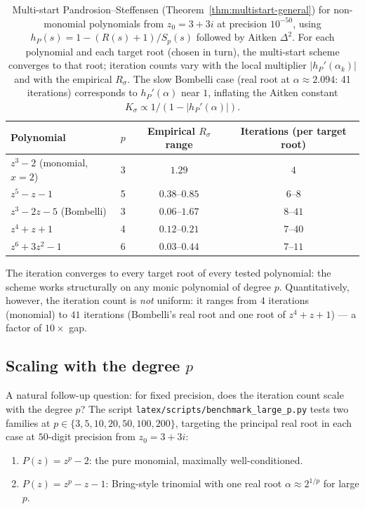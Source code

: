 \documentclass[11pt,a4paper]{article}
\theoremstyle{definition}
\begin{document}
\begin{table}[H]
\centering
\small
\renewcommand{\arraystretch}{1.2}
\begin{tabular}{lccc}
\toprule
Polynomial & $p$ & Empirical $R_\sigma$ range & Iterations (per target root) \\
\midrule
$z^3 - 2$ (monomial, $x=2$)   & 3 & $1.29$          & $4$ \\
$z^5 - z - 1$                 & 5 & $0.38$--$0.85$  & $6$--$8$ \\
$z^3 - 2z - 5$ (Bombelli)     & 3 & $0.06$--$1.67$  & $8$--$41$ \\
$z^4 + z + 1$                 & 4 & $0.12$--$0.21$  & $7$--$40$ \\
$z^6 + 3z^2 - 1$              & 6 & $0.03$--$0.44$  & $7$--$11$ \\
\bottomrule
\end{tabular}
\caption{Multi-start Pandrosion--Steffensen (Theorem~\ref{thm:multistart-general}) for non-monomial polynomials from $z_0 = 3 + 3i$ at precision $10^{-50}$, using $h_P(s) = 1 - (R(s) + 1)/S_p(s)$ followed by Aitken $\Delta^2$. For each polynomial and each target root (chosen in turn), the multi-start scheme converges to that root; iteration counts vary with the local multiplier $|h_P'(\alpha_k)|$ and with the empirical $R_\sigma$. The slow Bombelli case (real root at $\alpha \approx 2.094$: 41 iterations) corresponds to $h_P'(\alpha)$ near $1$, inflating the Aitken constant $K_\sigma \propto 1/(1 - |h_P'(\alpha)|)$.}
\label{tab:multistart-general}
\end{table}

The iteration converges to every target root of every tested polynomial: the scheme works structurally on any monic polynomial of degree $p$. Quantitatively, however, the iteration count is \emph{not} uniform: it ranges from $4$ iterations (monomial) to $41$ iterations (Bombelli's real root and one root of $z^4 + z + 1$) --- a factor of $10\times$ gap.

\subsection{Scaling with the degree $p$}

A natural follow-up question: for fixed precision, does the iteration count scale with the degree $p$? The script \texttt{latex/scripts/benchmark\_large\_p.py} tests two families at $p \in \{3, 5, 10, 20, 50, 100, 200\}$, targeting the principal real root in each case at $50$-digit precision from $z_0 = 3 + 3i$:
\begin{enumerate}
  \item[(A)] $P(z) = z^p - 2$: the pure monomial, maximally well-conditioned.
  \item[(B)] $P(z) = z^p - z - 1$: Bring-style trinomial with one real root $\alpha \approx 2^{1/p}$ for large $p$.
\end{enumerate}
\end{document}
